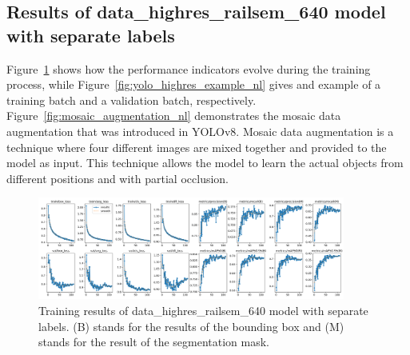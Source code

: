 \documentclass[Master,MDS,english]{BASE/twbook} %
\begin{document}

\subsection{Results of data\_highres\_railsem\_640 model with separate labels}

Figure~\ref{fig:training_highres_nl} shows how the performance indicators evolve during the training process, while Figure~\ref{fig:yolo_highres_example_nl} gives and example of a training batch and a validation batch, respectively.
Figure~\ref{fig:mosaic_augmentation_nl} demonstrates the mosaic data augmentation that was introduced in YOLOv8. 
Mosaic data augmentation is a technique where four different images are mixed together and provided to the model as input. This technique allows the model to learn the actual objects from different positions and with partial occlusion. 


\begin{figure}[h]
\centering
\includegraphics[width=0.9\textwidth]{images/yolo/highres/results}
\caption{Training results of data\_highres\_railsem\_640 model with separate labels. (B) stands for the results of the bounding box and (M) stands for the result of the segmentation mask.}
\label{fig:training_highres_nl}
\end{figure}
\end{document}
